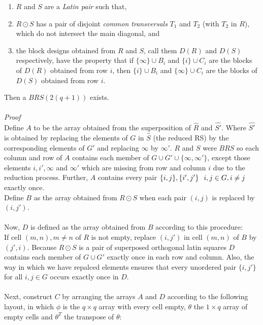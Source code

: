 \documentclass[
  11pt,
  a4paper]{book}
\begin{document}
\begin{enumerate}
\def\labelenumi{\arabic{enumi}.}
\item
  \(R\) and \(S\) are a \emph{Latin pair} such that,
\item
  \(R \odot S\) has a pair of disjoint \emph{common transversals} \(T_1\) and
  \(T_2\) (with \(T_2\) in \(R\)), which do not intersect the main diagonal,
  and
\item
  the block designs obtained from \(R\) and \(S\), call them \(D(R)\) and
  \(D(S)\) respectively, have the property that if \(\{\infty\} \cup B_i\)
  and \(\{i\} \cup C_i\) are the blocks of \(D(R)\) obtained from row \(i\),
  then \(\{i\} \cup B_i\) and \(\{\infty\} \cup C_i\) are the blocks of
  \(D(S)\) obtained from row \(i\).
\end{enumerate}

Then a \(BRS(2(q+1))\) exists.\\
~\\
\emph{Proof}\\
Define \(A\) to be the array obtained from the superposition of \(\hat{R}\)
and \(\hat{S'}\). Where \(\hat{S'}\) is obtained by replacing the elements
of \(G\) in \(\hat{S}\) (the reduced RS) by the corresponding elements of
\(G'\) and replacing \(\infty\) by \(\infty'\). \(R\) and \(S\) were \(BRS\) so each
column and row of \(A\) contains each member of
\(G \cup G' \cup \{\infty,\infty'\}\), except those elements \(i,i',\infty\)
and \(\infty'\) which are missing from row and column \(i\) due to the
reduction process. Further, \(A\) contains every pair
\(\{i,j\},\{i',j'\} \hspace{0.25cm} i,j \in G,i \neq j\) exactly once.\\
Define \(B\) as the array obtained from \(R \odot S\) when each pair \((i,j)\)
is replaced by \((i,j')\).\\
~\\
Now, \(D\) is defined as the array obtained from \(B\) according to this
procedure:\\
If cell \((m,n), m\neq n\) of \(R\) is not empty, replace \((i,j')\) in cell
\((m,n)\) of \(B\) by \((j',i)\). Because \(R \odot S\) is a pair of superposed
orthogonal latin squares \(D\) contains each member of \(G \cup G'\) exactly
once in each row and column. Also, the way in which we have repalced
elements ensures that every unordered pair \(\{i,j'\}\) for all
\(i,j \in G\) occurs exactly once in \(D\).\\
~\\
Next, construct \(C\) by arranging the arrays \(A\) and \(D\) according to the
following layout, in which \(\phi\) is the \(q \times q\) array with every
cell empty, \(\theta\) the \(1 \times q\) array of empty cells and
\(\theta ^T\) the transpose of \(\theta\):
\end{document}
